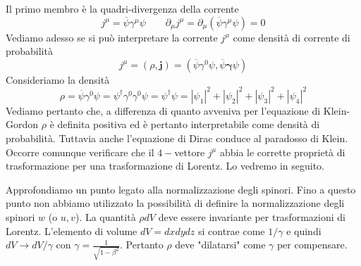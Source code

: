 Il primo membro è la quadri-divergenza della corrente
$$
j^\mu = \overline{\psi}\gamma^\mu \psi \qquad \partial_\mu j^\mu = \partial_\mu (\overline{\psi}\gamma^\mu \psi) = 0
$$
Vediamo adesso se si può interpretare la corrente $j^\mu$ come densità di corrente di probabilità
$$
j^\mu = (\rho, \mathbf{j}) = (\overline{\psi}\gamma^0 \psi, \overline{\psi}\boldsymbol{\gamma} \psi)
$$
Consideriamo la densità
$$
\rho = \overline{\psi}\gamma^0 \psi = \psi^\dagger \gamma^0 \gamma^0 \psi = \psi^\dagger \psi = |\psi_1|^2 + |\psi_2|^2 + |\psi_3|^2 + |\psi_4|^2
$$
Vediamo pertanto che, a differenza di quanto avveniva per l'equazione di Klein-Gordon $\rho$ è definita positiva ed è pertanto interpretabile come densità di probabilità. Tuttavia anche l'equazione di Dirac conduce al paradosso di Klein. Occorre comunque verificare che il $4-$vettore $j^\mu$ abbia le corrette proprietà di trasformazione per una trasformazione di Lorentz. Lo vedremo in seguito.

Approfondiamo un punto legato alla normalizzazione degli spinori. Fino a questo punto non abbiamo utilizzato la possibilità di definire la normalizzazione degli spinori $w$ (o $u, v$). La quantità $\rho dV$ deve essere invariante per trasformazioni di Lorentz. L'elemento di volume $dV=dxdydz$ si contrae come $1/\gamma$ e quindi $dV\to dV/\gamma$ con $\gamma=\frac{1}{\sqrt{1-\beta^2}}$. Pertanto $\rho$ deve "dilatarsi" come $\gamma$ per compensare.
